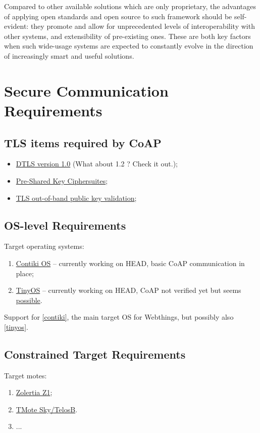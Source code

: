 \documentclass[10pt]{article}
\begin{document}
Compared to other available solutions which are only proprietary, the advantages of applying open standards and open source to such framework should be self-evident: they promote and allow for unprecedented levels of interoperability with other systems, and extensibility of pre-existing ones. These are both key factors when such wide-usage systems are expected to constantly evolve in the direction of increasingly smart and useful solutions.

\section{Secure Communication Requirements}

\subsection{TLS items required by CoAP}
\begin{itemize}
\item \href{http://tools.ietf.org/html/rfc4347}{DTLS version 1.0} (What about 1.2 ?  Check it out.);
\item \href{http://tools.ietf.org/html/rfc4279}{Pre-Shared Key Ciphersuites};
\item \href{http://tools.ietf.org/html/draft-wouters-tls-oob-pubkey}{TLS out-of-band public key validation};
\end{itemize}

\subsection{OS-level Requirements}
Target operating systems:
\begin{enumerate}
\item\label{contiki} \href{http://www.contiki-os.org}{Contiki OS} -- currently working on HEAD, basic CoAP communication in place;
\item\label{tinyos} \href{http://www.tinyos.net}{TinyOS} -- currently working on HEAD, CoAP not verified yet but seems \href{http://zolertia.sourceforge.net/wiki/index.php/Blip_v2.0}{possible}.
\end{enumerate}

Support for \ref{contiki}, the main target OS for Webthings, but possibly also \ref{tinyos}.

\subsection{Constrained Target Requirements}
Target motes:
\begin{enumerate}
\item\label{z1} \href{http://www.zolertia.com/ti}{Zolertia Z1};
\item\label{tmote} \href{http://www.ti.com/tool/msp430-3p-motei-tmotesky-dsgkt}{TMote Sky/TelosB}.
\item ...
\end{enumerate}
\end{document}
